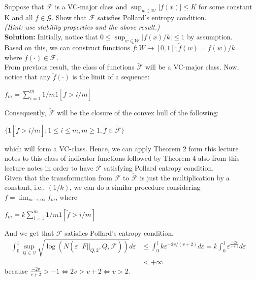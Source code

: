 \documentclass[11pt,letterpaper]{article}                  %
\begin{document}
\bigskip
\begin{problem} Suppose that $\mathcal{F}$ is a VC-major class and $\sup_{w \in \mathcal{W}} |f(x)| \leq K$ for some constant K and all $f \in \mathcal{G}$. Show that $\mathcal{F}$ satisfies Pollard's entropy condition.\\
\textit{(Hint: use stability properties and the above result.)}\\

\textbf{Solution:} Initially, notice that $0\leq \sup_{w \in \mathcal{W}} |f(x)/k|\leq 1$ by assumption. Based on this, we can construct functions $\tilde{f}:W\mapsto [0,1]; \tilde{f}(w) = f(w)/k$ where $f(\cdot) \in \mathcal{F}$.\\
From previous result, the class of functions $\tilde{\mathcal{F}}$ will be a VC-major class. Now, notice that any $\tilde{f}(\cdot)$ is the limit of a sequence:
\begin{center}
$\tilde{f}_m = \sum_{i=1}^m 1/m 1[\tilde{f}>i/m]$
\end{center}
Consequently, $\tilde{\mathcal{F}}$ will be the closure of the convex hull of the following:
\begin{center}
$\{1[\tilde{f}>i/m]; 1\leq i \leq m, m\geq 1, \tilde{f} \in \tilde{\mathcal{F}}\}$
\end{center}
which will form a VC-class. Hence, we can apply Theorem 2 form this lecture notes to this class of indicator functions followed by Theorem 4 also from this lecture notes in order to have $\tilde{\mathcal{F}}$ satisfying Pollard entropy condition.\\

Given that the transformation from $\mathcal{F}$ to $\tilde{\mathcal{F}}$ is just the multiplication by a constant, i.e., $(1/k)$, we can do a similar procedure considering $f = \lim_{m\to \infty} f_m$, where
\begin{center}
$f_m = k \sum_{i=1}^m 1/m 1[\tilde{f}>i/m]$
\end{center}
And we get that $\mathcal{F}$ satisfies Pollard's entropy condition.
\begin{align*}
\int_0^1 \sup_{Q \in \mathcal{Q}} \sqrt{\log(N(\varepsilon ||F||_{Q,2}, Q, \mathcal{F}))} d\varepsilon &\leq \int_0^1 k \varepsilon^{-2v/(v+2)} d\varepsilon = k \int_0^1 \varepsilon^{\frac{-2v}{v+2}} d\varepsilon \\
&< +\infty
\end{align*}
because $\frac{-2v}{v+2}>-1 \iff 2v > v+2 \iff v>2$.
\end{problem}
\end{document}
